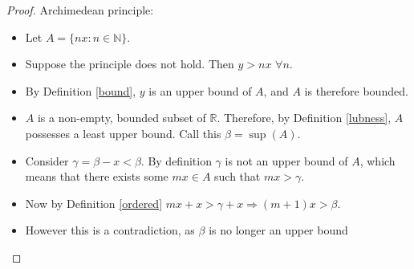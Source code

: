 \documentclass[12pt]{article}
\newcommand{\R}{\mathbb{R}}
\newcommand{\N}{\mathbb{N}}
\begin{document}
\begin{proof}
    
    Archimedean principle:
    
    \begin{itemize}
        \item Let $A =  \{nx: n \in \N \}$.
        \item Suppose the principle does not hold. Then $y > nx$ $\forall n$.
        \item By Definition \ref{bound}, $y$ is an upper bound of $A$, and $A$ is therefore bounded.
        \item $A$ is a non-empty, bounded subset of $\R$. Therefore, by Definition \ref{lubness}, $A$ possesses a least upper bound. Call this $\beta = \sup(A)$.
        \item Consider $\gamma = \beta - x < \beta$. By definition $\gamma$ is not an upper bound of $A$, which means that there exists some $mx \in A$ such that $mx > \gamma$.
        \item Now by Definition \ref{ordered} $mx + x > \gamma + x \Rightarrow (m+1)x > \beta$.
        \item However this is a contradiction, as $\beta$ is no longer an upper bound
    \end{itemize}
    
\end{proof}
\end{document}
